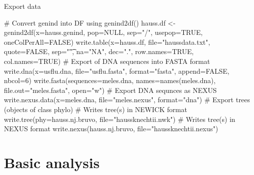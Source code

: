 \documentclass[compress, ucs, xelatex, 11pt, xcolor=svgnames,
  hyperref={
    bookmarks=true,
    unicode=true,
    colorlinks=true,
    pdftitle={Molecular data in R},
    plainpages=false,
    pdfauthor={Vojtech Zeisek},
    pdfsubject={Course about phylogeny and evolution in R},
    pdfcreator={XeLaTeX},
    pdfkeywords={R, evolution, phylogeny, molecular data},
    linkcolor=Tomato,
    anchorcolor=SaddleBrown,
    citecolor=Goldenrod,
    filecolor=DarkMagenta,
    menucolor=Sienna,
    urlcolor=DarkTurquoise,
    pdftex},
  url={hyphens, lowtilde} %
  ]{beamer}
\begin{document}
\begin{frame}[fragile]{Export data}
  \begin{spluscode}
    # Convert genind into DF using genind2df()
    hauss.df <- genind2df(x=hauss.genind, pop=NULL, sep="/",
      usepop=TRUE, oneColPerAll=FALSE)
    write.table(x=hauss.df, file="haussdata.txt", quote=FALSE,
      sep="\t", na="NA", dec=".", row.names=TRUE, col.names=TRUE)
    # Export of DNA sequences into FASTA format
    write.dna(x=usflu.dna, file="usflu.fasta", format="fasta",
      append=FALSE, nbcol=6)
    write.fasta(sequences=meles.dna, names=names(meles.dna),
      file.out="meles.fasta", open="w")
    # Export DNA sequnces as NEXUS
    write.nexus.data(x=meles.dna, file="meles.nexus", format="dna")
    # Export trees (objects of class phylo)
    # Writes tree(s) in NEWICK format
    write.tree(phy=hauss.nj.bruvo, file="haussknechtii.nwk")
    # Writes tree(s) in NEXUS format
    write.nexus(hauss.nj.bruvo, file="haussknechtii.nexus")
  \end{spluscode}
\end{frame}

\section{Basic analysis}
\end{document}
